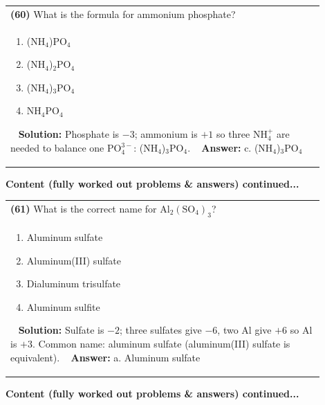 \documentclass{article}
\begin{document}
{\begin{tabular}{|p{0.9\linewidth}|}
\hline
\vspace{0.2cm}
\textbf{(60)} What is the formula for ammonium phosphate? \\
\begin{minipage}[t]{0.85\linewidth}
\begin{enumerate}[label=\alph*.]
\item (NH$_4$)PO$_4$ \
\item (NH$_4$)$_2$PO$_4$ \
\item (NH$_4$)$_3$PO$_4$ \
\item NH$_4$PO$_4$
\end{enumerate}
\end{minipage}\
\hline
\vspace{0.2cm}
\textbf{Solution:} Phosphate is $-3$; ammonium is $+1$ so three NH$_4^+$ are needed to balance one PO$_4^{3-}$: (NH$_4$)$_3$PO$_4$. \
\hline
\vspace{0.2cm}
\textbf{Answer:} c. (NH$_4$)$_3$PO$_4$ \
\hline
\end{tabular}
\newpage
\noindent
{\large\textbf{Content (fully worked out problems & answers) continued...}}\\[0.2em]
\begin{tabular}{|p{0.9\linewidth}|}
\hline
\vspace{0.2cm}
\textbf{(61)} What is the correct name for $\text{Al}_2(\text{SO}_4)_3$? \\
\begin{minipage}[t]{0.85\linewidth}
\begin{enumerate}[label=\alph*.]
\item Aluminum sulfate \
\item Aluminum(III) sulfate \
\item Dialuminum trisulfate \
\item Aluminum sulfite
\end{enumerate}
\end{minipage}\
\hline
\vspace{0.2cm}
\textbf{Solution:} Sulfate is $-2$; three sulfates give $-6$, two Al give $+6$ so Al is $+3$. Common name: aluminum sulfate (aluminum(III) sulfate is equivalent). \
\hline
\vspace{0.2cm}
\textbf{Answer:} a. Aluminum sulfate \
\hline
\end{tabular}
\newpage
\noindent
{\large\textbf{Content (fully worked out problems & answers) continued...}}\\[0.2em]
\begin{tabular}{|p{0.9\linewidth}|}

\end{tabular}}
\end{document}
